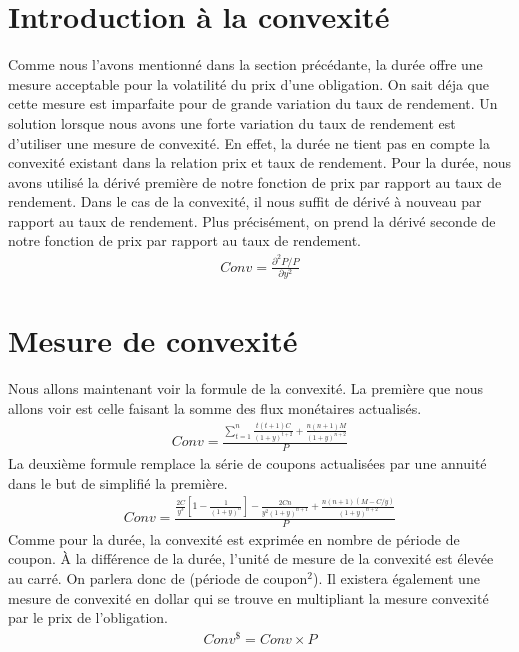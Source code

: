 \documentclass[letterpaper, 12pt]{article}
\newcommand{\1}{\mathds{1}}	%
\theoremstyle{definition}
\begin{document}
\section{Introduction à la convexité}
Comme nous l'avons mentionné dans la section précédante, la durée offre une mesure acceptable pour la volatilité du prix d'une obligation. On sait déja que cette mesure est imparfaite pour de grande variation du taux de rendement. Un solution lorsque nous avons une forte variation du taux de rendement est d'utiliser une mesure de convexité. En effet, la durée ne tient pas en compte la convexité existant dans la relation prix et taux de rendement. Pour la durée, nous avons utilisé la dérivé première de notre fonction de prix par rapport au taux de rendement. Dans le cas de la convexité, il nous suffit de dérivé à nouveau par rapport au taux de rendement. Plus précisément, on prend la dérivé seconde de notre fonction de prix par rapport au taux de rendement.
\begin{align*}
Conv=\frac{\partial^2P /P}{\partial y^2}
\end{align*}
\section{Mesure de convexité}
Nous allons maintenant voir la formule de la convexité. La première que nous allons voir est celle faisant la somme des flux monétaires actualisés. 
\begin{align*}
Conv=\frac{\sum_{t=1}^n \frac{t(t+1)C}{(1+y)^{t+2}}+\frac{n(n+1)M}{(1+y)^{n+2}}}{P}
\end{align*}
La deuxième formule remplace la série de coupons actualisées par une annuité dans le but de simplifié la première.
\begin{align*}
Conv=\frac{\frac{2C}{y^3} \left[1-\frac{1}{(1+y)^n} \right] -\frac{2Cn}{y^2(1+y)^{n+1}}+\frac{n(n+1)(M-C/y)}{(1+y)^{n+2}}}{P}
\end{align*}
Comme pour la durée,  la convexité est exprimée en nombre de période de coupon.  À la différence de la durée,  l'unité de mesure de la convexité est élevée au carré.  On parlera donc de (période de coupon$^2$).  Il existera également une mesure de convexité en dollar qui se trouve en multipliant la mesure convexité par le prix de l'obligation.
\begin{align*}
Conv^{\$}=Conv \times P
\end{align*}
\end{document}
